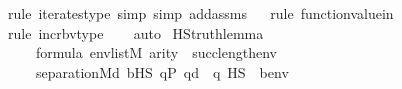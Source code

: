 \begin{isabellebody}
{\isacharparenleft}{\kern0pt}rule\ iterates{\isacharunderscore}{\kern0pt}type{\isacharcomma}{\kern0pt}\ simp{\isacharcomma}{\kern0pt}\ simp\ add{\isacharcolon}{\kern0pt}assms{\isacharparenright}{\kern0pt}\isanewline
\ \ \isamarkupfalse%
{\isacharparenleft}{\kern0pt}rule\ function{\isacharunderscore}{\kern0pt}value{\isacharunderscore}{\kern0pt}in{\isacharparenright}{\kern0pt}\isanewline
\ \ \ \isamarkupfalse%
{\isacharparenleft}{\kern0pt}rule\ incr{\isacharunderscore}{\kern0pt}bv{\isacharunderscore}{\kern0pt}type{\isacharparenright}{\kern0pt}\isanewline
\ \ \isamarkupfalse%
\ auto%
\endisatagproof
{\isafoldproof}%
%
\isadelimproof
\isanewline
%
\endisadelimproof
\isanewline
{}\isamarkupfalse%
\ HS{\isacharunderscore}{\kern0pt}truth{\isacharunderscore}{\kern0pt}lemma{\isacharprime}{\kern0pt}\ {\isacharcolon}{\kern0pt}\isanewline
\ \ \isanewline
\ \ \ \ {\isachardoublequoteopen}{\isasymphi}{\isasymin}formula{\isachardoublequoteclose}\ {\isachardoublequoteopen}env{\isasymin}list{\isacharparenleft}{\kern0pt}M{\isacharparenright}{\kern0pt}{\isachardoublequoteclose}\ {\isachardoublequoteopen}arity{\isacharparenleft}{\kern0pt}{\isasymphi}{\isacharparenright}{\kern0pt}\ {\isasymle}\ succ{\isacharparenleft}{\kern0pt}length{\isacharparenleft}{\kern0pt}env{\isacharparenright}{\kern0pt}{\isacharparenright}{\kern0pt}{\isachardoublequoteclose}\ \isanewline
\ \ \isanewline
\ \ \ \ {\isachardoublequoteopen}separation{\isacharparenleft}{\kern0pt}{\isacharhash}{\kern0pt}{\isacharhash}{\kern0pt}M{\isacharcomma}{\kern0pt}{\isasymlambda}d{\isachardot}{\kern0pt}\ {\isasymexists}b{\isasymin}HS{\isachardot}{\kern0pt}\ {\isasymforall}q{\isasymin}P{\isachardot}{\kern0pt}\ q{\isasympreceq}d\ {\isasymlongrightarrow}\ {\isasymnot}{\isacharparenleft}{\kern0pt}q\ {\isasymtturnstile}HS\ {\isasymphi}\ {\isacharparenleft}{\kern0pt}{\isacharbrackleft}{\kern0pt}b{\isacharbrackright}{\kern0pt}{\isacharat}{\kern0pt}env{\isacharparenright}{\kern0pt}{\isacharparenright}{\kern0pt}{\isacharparenright}{\kern0pt}{\isachardoublequoteclose}\isanewline
%
\isadelimproof
%
\endisadelimproof
%
\isatagproof
{}\isamarkupfalse%
\ {\isacharminus}{\kern0pt}\isanewline
\isanewline
\ \ \isamarkupfalse%

\end{isabellebody}
